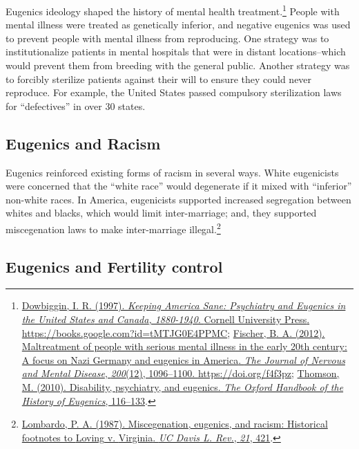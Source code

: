 \documentclass[
  oneside,
  12pt]{crumpbook}
\begin{document}
Eugenics ideology shaped the history of mental health treatment.\footnote{\protect\hyperlink{ref-dowbigginKeepingAmericaSane1997}{Dowbiggin, I. R. (1997). \emph{Keeping {America Sane}: {Psychiatry} and {Eugenics} in the {United States} and {Canada}, 1880-1940}. {Cornell University Press}. \url{https://books.google.com?id=tMTJG0E4PPMC}}; \protect\hyperlink{ref-fischerMaltreatmentPeopleSerious2012}{Fischer, B. A. (2012). Maltreatment of people with serious mental illness in the early 20th century: A focus on {Nazi Germany} and eugenics in {America}. \emph{The Journal of Nervous and Mental Disease}, \emph{200}(12), 1096--1100. \url{https://doi.org/f4f3pz}}; \protect\hyperlink{ref-thomsonDisabilityPsychiatryEugenics2010}{Thomson, M. (2010). Disability, psychiatry, and eugenics. \emph{The Oxford Handbook of the History of Eugenics}, 116--133}.} People with mental illness were treated as genetically inferior, and negative eugenics was used to prevent people with mental illness from reproducing. One strategy was to institutionalize patients in mental hospitals that were in distant locations--which would prevent them from breeding with the general public. Another strategy was to forcibly sterilize patients against their will to ensure they could never reproduce. For example, the United States passed compulsory sterilization laws for ``defectives'' in over 30 states.

\hypertarget{eugenics-and-racism}{%
\subsection{Eugenics and Racism}\label{eugenics-and-racism}}

Eugenics reinforced existing forms of racism in several ways. White eugenicists were concerned that the ``white race'' would degenerate if it mixed with ``inferior'' non-white races. In America, eugenicists supported increased segregation between whites and blacks, which would limit inter-marriage; and, they supported miscegenation laws to make inter-marriage illegal.\footnote{\protect\hyperlink{ref-lombardoMiscegenationEugenicsRacism1987}{Lombardo, P. A. (1987). Miscegenation, eugenics, and racism: {Historical} footnotes to {Loving} v. {Virginia}. \emph{UC Davis L. Rev.}, \emph{21}, 421}.}

\hypertarget{eugenics-and-fertility-control}{%
\subsection{Eugenics and Fertility control}\label{eugenics-and-fertility-control}}
\end{document}

